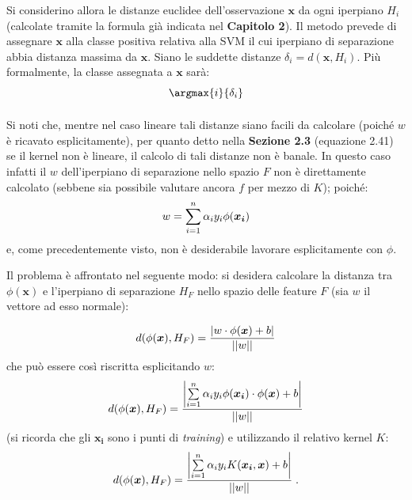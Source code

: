 Si considerino allora le distanze euclidee dell'osservazione $\boldsymbol{x}$ da ogni iperpiano $H_i$ (calcolate tramite la formula già indicata nel \textbf{Capitolo 2}).
Il metodo prevede di assegnare $\boldsymbol{x}$ alla classe positiva relativa alla SVM il cui iperpiano di separazione abbia distanza massima da $\boldsymbol{x}$.
Siano le suddette distanze $\delta_i = d(\boldsymbol{x}, H_i)$. Più formalmente, la classe assegnata a $\boldsymbol{x}$ sarà:
\begin{equation}
	\argmax{i}{\delta_i}
\end{equation}

\paragraph{}
Si noti che, mentre nel caso lineare tali distanze siano facili da calcolare (poiché $w$ è ricavato esplicitamente), per quanto detto nella \textbf{Sezione 2.3} (equazione 2.41) se il kernel non è lineare, il calcolo di tali distanze non è banale.
In questo caso infatti il $w$ dell'iperpiano di separazione nello spazio $F$ non è direttamente calcolato (sebbene sia possibile valutare ancora $f$ per mezzo di $K$); poiché:
\begin{equation}		
	w = \sum\limits_{i = 1}^{n} {\alpha_i y_i \phi(\boldsymbol{x_i})}
\vspace{2mm}
\end{equation}
e, come precedentemente visto, non è desiderabile lavorare esplicitamente con $\phi$.

Il problema è affrontato nel seguente modo: si desidera calcolare la distanza tra $\phi(\boldsymbol{x})$ e l'iperpiano di separazione $H_F$ nello spazio delle feature $F$ (sia $w$ il vettore ad esso normale):

\begin{equation}
	d(\phi(\boldsymbol{x}), H_F) = \frac{|w \cdot \phi(\boldsymbol{x}) + b|}{||w||}
\vspace{2mm}
\end{equation}
che può essere così riscritta esplicitando $w$:
\begin{equation}
	d(\phi(\boldsymbol{x}), H_F) = \frac{
	\left|\sum\limits_{i = 1}^{n} {\alpha_i y_i \phi(\boldsymbol{x_i})} \cdot \phi(\boldsymbol{x}) + b \right|
	}{||w||}
\vspace{2mm}
\end{equation}
(si ricorda che gli $\boldsymbol{x_i}$ sono i punti di \textit{training}) e utilizzando il relativo kernel $K$:
\begin{equation}
	d(\phi(\boldsymbol{x}), H_F) = \frac{
	\left|\sum\limits_{i = 1}^{n} {\alpha_i y_i 	K(\boldsymbol{x_i}, \boldsymbol{x})+ b} \right| }{||w||} \;.
\vspace{2mm}
\end{equation}

